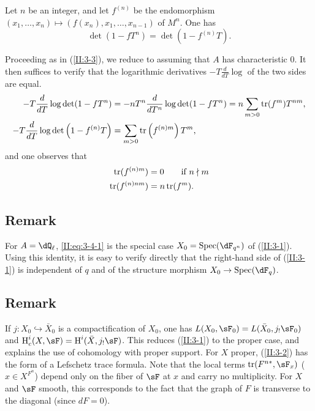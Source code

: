 \begin{corollary_}\label{II:3-4}
Let $n$ be an integer, and let $f^{(n)}$ be the endomorphism
$(x_1,\dotsc,x_n)\mapsto \left(f(x_n),x_1,\dotsc,x_{n-1}\right)$ of $M^n$.
One has
\begin{equation*}\tag{3.4.1}\label{II:eq:3-4-1}
  \det(1-f T^n) = \det(1-f^{(n)} T) \text{.}
\end{equation*}
\end{corollary_}

Proceeding as in (\ref{II:3-3}), we reduce to assuming that $A$ has
characteristic $0$. It then suffices to verify that the logarithmic
derivatives $-T\frac{d}{dT}\log$ of the two sides are equal.
\begin{align*}
  -T\frac{d}{dT}\log\det(1-f T^n) &= - n T^n \frac{d}{dT^n} \log\det(1-f T^n) = n \sum_{m>0} \operatorname{tr}(f^m) T^{n m} \text{,} \\
  -T \frac{d}{dT}\log\det\left(1-f^{(n)} T\right) &= \sum_{m>0} \operatorname{tr}\left(f^{(n) m}\right) T^m \text{,}
\end{align*}
and one observes that
\begin{align*}
  \operatorname{tr}(f^{(n) m}) &= 0 \qquad \text{if $n\nmid m$} \\
  \operatorname{tr}(f^{(n) n m}) &= n \operatorname{tr}(f^m) \text{.}
\end{align*}






\subsection{Remark}\label{II:3-5}

For $A=\dQ_\ell$, \eqref{II:eq:3-4-1} is the special case
$X_0=\spec(\dF_{q^n})$ of (\ref{II:3-1}). Using this identity, it is easy to
verify directly that the right-hand side of (\ref{II:3-1}) is independent of
$q$ and of the structure morphism $X_0\to\spec(\dF_q)$.






\subsection{Remark}\label{II:3-6}

If $j:X_0\hookrightarrow \bar X_0$ is a compactification of $X_0$, one has
$L(X_0,\sF_0) = L(\bar X_0, j_!\sF_0)$ and
$\h_c^i(X,\sF) = \h^i(\bar X,j_!\sF)$. This reduces (\ref{II:3-1}) to the
proper case, and explains the use of cohomology with proper support. For $X$
proper, (\ref{II:3-2}) has the form of a Lefschetz trace formula. Note that
the local terms $\tr(F^{n *},\sF_x)$ ($x\in X^{F^n}$) depend only on the
fiber of $\sF$ at $x$ and carry no multiplicity. For $X$ and $\sF$ smooth,
this corresponds to the fact that the graph of $F$ is transverse to the
diagonal (since $d F = 0$).






